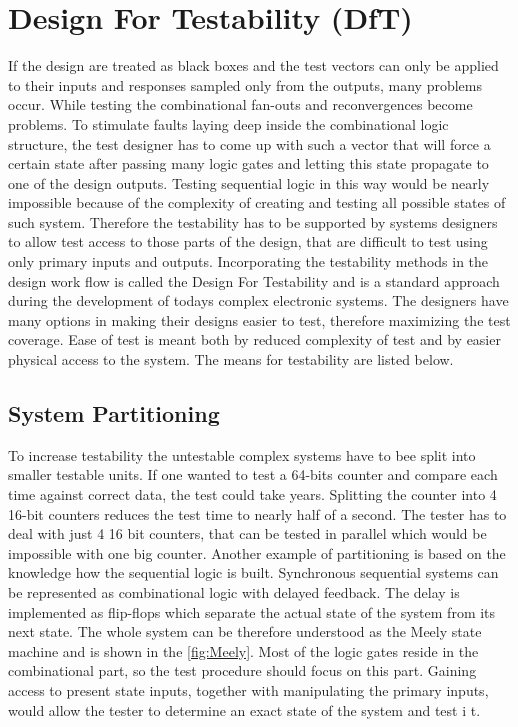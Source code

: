 \section{Design For Testability (DfT)}
If the design are treated as black boxes and the test vectors can only be applied to their inputs and responses sampled only from the outputs, many problems occur. While testing the combinational fan-outs and reconvergences become problems. To stimulate faults laying deep inside the combinational logic structure, the test designer has to come up with such a vector that will force a certain state after passing many logic gates and letting this state propagate to one of the design outputs. Testing sequential logic in this way would be nearly impossible because of the complexity of creating and testing all possible states of such system. Therefore the testability has to be supported by systems designers to allow test access to those parts of the design, that are difficult to test using only primary inputs and outputs. Incorporating the testability methods in the design work flow is called the Design For Testability and is a standard approach during the development of todays complex electronic systems. The designers have many options in making their designs easier to test, therefore maximizing the test coverage. Ease of test is meant both by reduced complexity of test and by easier physical access to the system. The means for testability are listed below.
\subsection{System Partitioning}
To increase testability the untestable complex systems have to bee split into smaller testable units. If one wanted to test a 64-bits counter and compare each time against correct data, the test could take years. Splitting the counter into 4 16-bit counters reduces the test time to nearly half of a second. The tester has to deal with just 4 16 bit counters, that can be tested in parallel which would be impossible with one big counter.
Another example of partitioning is based on the knowledge how the sequential logic is built. Synchronous sequential systems can be represented as combinational logic with delayed feedback. The delay is implemented as flip-flops which separate the actual state of the system from its next state. The whole system can be therefore understood as the Meely state machine and is shown in the \autoref{fig:Meely}. Most of the logic gates reside in the combinational part, so the test procedure should focus on this part. Gaining access to present state inputs, together with manipulating the primary inputs, would allow the tester to determine an exact state of the system and test i
t.

